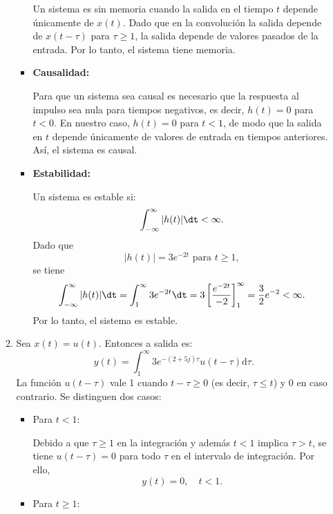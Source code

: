 \begin{enumerate}[label=\color{red}\textbf{\arabic*)}]
\begin{enumerate}[label=\color{red}\textbf{\alph*)}]
\begin{itemize}[label=\textbullet]
                Un sistema es sin memoria cuando la salida en el tiempo $t$ depende únicamente de  $x(t)$. Dado que en la convolución la salida depende de  $x(t-\tau)$ para  $\tau\ge 1$, la salida depende de valores pasados de la entrada. Por lo tanto, el sistema tiene memoria.
            \item \textbf{Causalidad:}

                Para que un sistema sea causal es necesario que la respuesta al impulso sea nula para tiempos negativos, es decir, $h(t)=0$ para $t<0$. En nuestro caso,  $h(t)=0$ para  $t<1$, de modo que la salida en  $t$ depende únicamente de valores de entrada en tiempos anteriores. Así, el sistema es causal.
            \item \textbf{Estabilidad:}

                Un sistema es estable si: \[
                \int_{-\infty}^{\infty} |h(t)|\dt<\infty. 
                \] 
                Dado que \[
                |h(t)|=3e^{-2t} \text{ para } t\ge 1,
                \] se tiene \[
                \int_{-\infty}^{\infty} |h(t)|\dt=\int_{1}^{\infty} 3e^{-2t}\dt=3\left[ \dfrac{e^{-2t} }{-2} \right]_1^\infty=\dfrac{3}{2}e^{-2}<\infty.
            \] 
            Por lo tanto, el sistema es estable.
        \end{itemize}
    \item {}

        Sea $x(t)=u(t)$. Entonces a salida es:  \[
        y(t)=\int_{1}^{\infty} 3e^{-(2+5j)\tau}u(t-\tau)\mathrm{d}\tau.  
        \] 
        La función  $u(t-\tau)$ vale 1 cuando  $t-\tau\ge 0$ (es decir, $\tau\le t$) y 0 en caso contrario. Se distinguen dos casos:
        \begin{itemize}[label=\textbullet]
            \item Para $t<1$:

                Debido a que  $\tau\ge 1$ en la integración y además $t<1$ implica  $\tau>t$, se tiene  $u(t-\tau)=0$ para todo  $\tau$ en el intervalo de integración. Por ello,  \[
                y(t)=0,\quad t<1.
                \] 
            \item Para $t\ge 1$:


\end{itemize}
\end{enumerate}
\end{enumerate}
